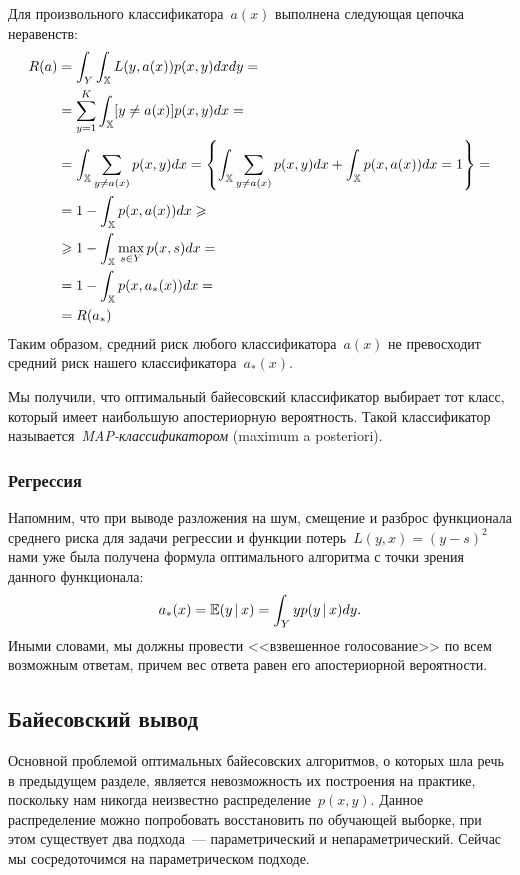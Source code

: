\documentclass[12pt,fleqn]{article}
\begin{document}
Для произвольного классификатора~$a(x)$ выполнена
следующая цепочка неравенств:
\begin{align*}
    R(a)
    &=
    \int_{Y} \int_{\mathbb{X}} L(y, a(x)) p(x, y) dx dy
    =
    \\
    &=
    \sum_{y = 1}^{K} \int_{\mathbb{X}} [y \neq a(x)] p(x, y) dx
    =
    \\
    &=
    \int_{\mathbb{X}} \sum_{y \neq a(x)} p(x, y) dx
    =
    \left\{
    \int_{\mathbb{X}} \sum_{y \neq a(x)} p(x, y) dx
    +
    \int_{\mathbb{X}} p(x, a(x)) dx
    =
    1
    \right\}
    =
    \\
    &=
    1 - \int_{\mathbb{X}} p(x, a(x)) dx
    \geqslant\\
    &\geqslant
    1 - \int_{\mathbb{X}} \max_{s \in Y} p(x, s) dx
    =
    \\
    &=
    1 - \int_{\mathbb{X}} p(x, a_*(x)) dx
    =
    \\
    &=
    R(a_*)
\end{align*}
Таким образом, средний риск любого классификатора~$a(x)$
не превосходит средний риск нашего классификатора~$a_*(x)$.

Мы получили, что оптимальный байесовский классификатор
выбирает тот класс, который имеет наибольшую апостериорную вероятность.
Такой классификатор называется~\emph{MAP-классификатором} (maximum a posteriori).

\subsubsection{Регрессия}

Напомним, что при выводе разложения на шум, смещение и разброс функционала среднего риска для задачи регрессии и функции потерь~$L(y, x) = (y - s)^2$ нами уже была получена формула оптимального алгоритма с точки зрения данного функционала:
\[
    a_*(x) = \mathbb{E} (y \mspace{3mu}{|}\mspace{3mu} x)
    =
    \int_Y y p(y \mspace{3mu}{|}\mspace{3mu} x) dy.
\]
Иными словами, мы должны провести <<взвешенное голосование>>
по всем возможным ответам, причем вес ответа равен его
апостериорной вероятности.

\subsection{Байесовский вывод}
Основной проблемой оптимальных байесовских алгоритмов,
о которых шла речь в предыдущем разделе, является
невозможность их построения на практике, поскольку нам никогда
неизвестно распределение~$p(x, y)$.
Данное распределение можно попробовать восстановить по обучающей выборке,
при этом существует два подхода~--- параметрический и непараметрический.
Сейчас мы сосредоточимся на параметрическом подходе.
\end{document}
